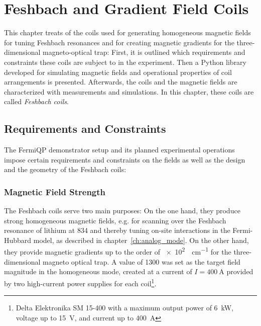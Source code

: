\renewcommand{\imagepath}{../40-coils/img}

\chapter{Feshbach and Gradient Field Coils}\label{ch:coils}
This chapter treats of the coils used for generating homogeneous magnetic fields for tuning Feshbach resonances and for creating magnetic gradients for the three-dimensional magneto-optical trap: First, it is outlined which requirements and constraints these coils are subject to in the experiment. Then a Python library developed for simulating magnetic fields and operational properties of coil arrangements is presented. Afterwards, the coils and the magnetic fields are characterized with measurements and simulations. In this chapter, these coils are called \textit{Feshbach coils}.

\section{Requirements and Constraints}
The FermiQP demonstrator setup and its planned experimental operations impose certain requirements and constraints on the fields as well as the design  and the geometry of the Feshbach coils:

\subsection*{Magnetic Field Strength}
The Feshbach coils serve two main purposes: On the one hand, they produce strong homogeneous magnetic fields, e.g. for scanning over the Feshbach resonance of lithium at \SI{834}{\gauss} and thereby tuning on-site interactions in the Fermi-Hubbard model, as described in chapter~\ref{ch:analog_mode}. On the other hand, they provide magnetic gradients up to the order of \SI[]{e2}{\gauss\per\centi\meter} for the three-dimensional magneto optical trap. A value of \SI{1300}{\gauss} was set as the target field magnitude in the homogeneous mode, created at a current of $I = \SI{400}{\ampere}$ provided by two high-current power supplies for each coil\footnote{Delta Elektronika SM 15-400 with a maximum output power of \SI[]{6}{\kilo\watt}, voltage up to \SI[]{15}{\volt}, and current up to \SI[]{400}{\ampere}}.

